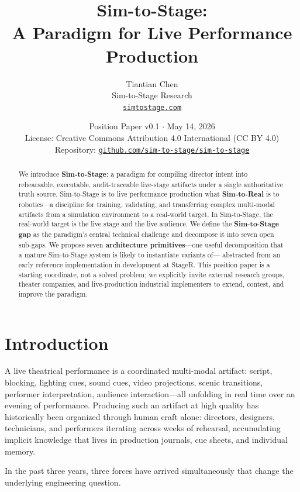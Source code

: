 \documentclass[11pt]{article}
\title{%
  \textbf{Sim-to-Stage:}\\[4pt]
  A Paradigm for Live Performance Production%
}
\author{%
  Tiantian Chen\\[2pt]
  \small Sim-to-Stage Research\\
  \small \href{https://simtostage.com}{\texttt{simtostage.com}}
}
\date{%
  Position Paper v0.1 $\cdot$ May 14, 2026\\[4pt]
  \small License: Creative Commons Attribution 4.0 International (CC BY 4.0)\\[2pt]
  \small Repository: \href{https://github.com/sim-to-stage/sim-to-stage}%
    {\texttt{github.com/sim-to-stage/sim-to-stage}}
}
\begin{document}
\maketitle
\thispagestyle{plain}

\begin{abstract}
We introduce \textbf{Sim-to-Stage}: a paradigm for compiling director
intent into rehearsable, executable, audit-traceable live-stage artifacts
under a single authoritative truth source.  Sim-to-Stage is to live
performance production what \textbf{Sim-to-Real} is to
robotics---a discipline for training, validating, and transferring complex
multi-modal artifacts from a simulation environment to a real-world target.
In Sim-to-Stage, the real-world target is the live stage and the live
audience.  We define the \textbf{Sim-to-Stage gap} as the paradigm's
central technical challenge and decompose it into seven open sub-gaps.
We propose seven \textbf{architecture primitives}---one useful decomposition
that a mature Sim-to-Stage system is likely to instantiate variants of---
abstracted from an early reference implementation in development at StageR.
This position paper is a starting coordinate, not a solved problem; we
explicitly invite external research groups, theater companies, and
live-production industrial implementers to extend, contest, and improve
the paradigm.
\end{abstract}

\tableofcontents
\newpage

\section{Introduction}

A live theatrical performance is a coordinated multi-modal artifact:
script, blocking, lighting cues, sound cues, video projections, scenic
transitions, performer interpretation, audience interaction---all unfolding
in real time over an evening of performance.  Producing such an artifact at
high quality has historically been organized through human craft alone:
directors, designers, technicians, and performers iterating across weeks of
rehearsal, accumulating implicit knowledge that lives in production journals,
cue sheets, and individual memory.

In the past three years, three forces have arrived simultaneously that
change the underlying engineering question.
\end{document}
